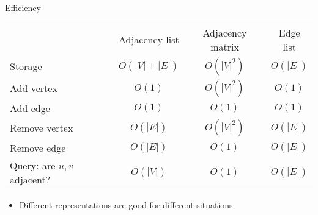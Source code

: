 \documentclass[12pt,t]{beamer}
\newcommand{\bi}{\begin{itemize}}
\newcommand{\ei}{\end{itemize}}
\begin{document}
\begin{frame}{Efficiency}

    \vspace{20pt}

    {
        \scriptsize
    \begin{center}
        \begin{tabular}{lccc}
            & Adjacency list & Adjacency matrix & Edge list \\
            Storage & $O(|V| + |E|)$ & $O(|V|^2)$ & $O(|E|)$ \\
            Add vertex & $O(1)$ & $O(|V|^2)$ & $O(1)$ \\
            Add edge & $O(1)$ & $O(1)$ & $O(1)$ \\
            Remove vertex & $O(|E|)$ & $O(|V|^2)$ & $O(|E|)$ \\
            Remove edge & $O(|E|)$ & $O(1)$ & $O(|E|)$ \\
            Query: are $u,v$ adjacent? & $O(|V|)$ & $O(1)$ & $O(|E|)$ \\
        \end{tabular}
    \end{center}
    }

    \bi
        \item Different representations are good for different situations
    \ei
\end{frame}
\end{document}
